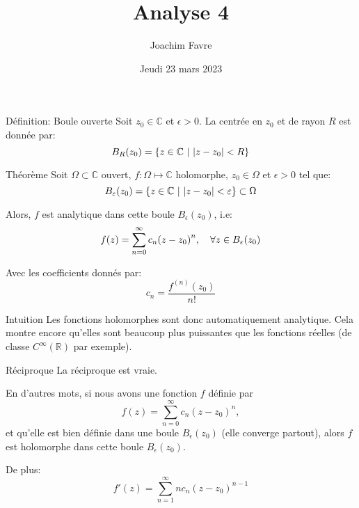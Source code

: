 \documentclass[a4paper]{article}
\title{Analyse 4}
\author{Joachim Favre}
\date{Jeudi 23 mars 2023}
\begin{document}
\maketitle


\begin{parag}{Définition: Boule ouverte}
    Soit $z_0 \in \mathbb{C}$ et $\epsilon >0$. La  centrée en $z_0$ et de rayon $R$ est donnée par: 
    \[B_{R}\left(z_0\right) = \left\{z \in \mathbb{C} \suchthat \left|z - z_0\right| < R\right\}\]
\end{parag}

\begin{parag}{Théorème}
    Soit $\Omega \subset\mathbb{C}$ ouvert, $f: \Omega \mapsto \mathbb{C}$ holomorphe, $z_0 \in \Omega$ et $\epsilon > 0$ tel que:
    \[B_{\epsilon}\left(z_0\right) = \left\{z \in \mathbb{C} \suchthat \left|z - z_0\right| < \epsilon\right\} \subset \Omega\]

    Alors, $f$ est analytique dans cette boule $B_{\epsilon}\left(z_0\right)$, i.e: 
    \[f\left(z\right) = \sum_{n=0}^{\infty} c_n \left(z - z_0\right)^n, \mathspace \forall z \in B_{\epsilon}\left(z_0\right)\]
    
    Avec les coefficients donnés par: 
    \[c_n = \frac{f^{\left(n\right)} \left(z_0\right)}{n!}\]

    \begin{subparag}{Intuition}
        Les fonctions holomorphes sont donc automatiquement analytique. Cela montre encore qu'elles sont beaucoup plus puissantes que les fonctions réelles (de classe $C^{\infty}\left(\mathbb{R}\right)$ par exemple).
    \end{subparag}

    \begin{subparag}{Réciproque}
        La réciproque est vraie.

        En d'autres mots, si nous avons une fonction $f$ définie par 
        \[f\left(z\right) = \sum_{n=0}^{\infty} c_n \left(z - z_0\right)^n,\]
        et qu'elle est bien définie dans une boule $B_{\epsilon}\left(z_0\right)$ (elle converge partout), alors $f$ est holomorphe dans cette boule $B_{\epsilon}\left(z_0\right)$.

        De plus: 
        \[f'\left(z\right) = \sum_{n=1}^{\infty} n c_n \left(z- z_0\right)^{n-1}\]
    \end{subparag}
\end{parag}
\end{document}
